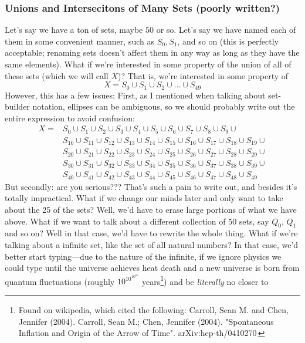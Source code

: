 \documentclass[10pt]{article}
\theoremstyle{definition}
\begin{document}
\subsubsection{Unions and Intersecitons of Many Sets (poorly written?)}
Let's say we have a ton of sets, maybe 50 or so.  Let's say we have
named each of them in some convenient manner, such as $S_0, S_1$, and
so on (this is perfectly acceptable; renaming sets doesn't affect them
in any way as long as they have the same elements).  What if we're
interested in some property of the union of all of these sets (which
we will call $X$)?  That is, we're interested in some property of
\[X = S_0\cup S_1\cup S_2 \cup \ldots \cup S_{49}\]
However, this has a few issues: First, as I mentioned when talking
about set-builder notation, ellipses can be ambiguous, so we should
probably write out the entire expression to avoid confusion:
\begin{align*}
X =&S_0\cup S_1\cup S_2 \cup S_3 \cup S_4 \cup S_5 \cup S_6 \cup S_7 \cup S_8 \cup S_9 \cup \\
&S_{10}\cup S_{11}\cup S_{12} \cup S_{13} \cup S_{14} \cup S_{15} \cup S_{16} \cup S_{17} \cup S_{18} \cup S_{19} \cup \\
&S_{20}\cup S_{21}\cup S_{22} \cup S_{23} \cup S_{24} \cup S_{25} \cup S_{26} \cup S_{27} \cup S_{28} \cup S_{29} \cup \\
&S_{30}\cup S_{31}\cup S_{32} \cup S_{33} \cup S_{34} \cup S_{35} \cup S_{36} \cup S_{37} \cup S_{38} \cup S_{39} \cup \\
&S_{40}\cup S_{41}\cup S_{42} \cup S_{43} \cup S_{44} \cup S_{45} \cup S_{46} \cup S_{47} \cup S_{48} \cup S_{49}
\end{align*}
But secondly: are you serious??? That's such a pain to write out, and
besides it's totally impractical.  What if we change our minds later
and only want to take about the 25 of the sets? Well, we'd have to
erase large portions of what we have above.  What if we want to talk
about a different collection of 50 sets, say $Q_0$, $Q_1$ and so on?
Well in that case, we'd have to rewrite the whole thing.  What if
we're talking about a infinite set, like the set of all natural
numbers?  In that case, we'd better start typing---due to the nature
of the infinite, if we ignore physics we could type until the universe
achieves heat death and a new universe is born from quantum
fluctuations (roughly $\displaystyle 10^{10^{10^{56}}}$
years\footnote{Found on wikipedia, which cited the following: Carroll,
  Sean M. and Chen, Jennifer (2004). Carroll, Sean M.; Chen, Jennifer
  (2004). "Spontaneous Inflation and Origin of the Arrow of Time".
  arXiv:hep-th/0410270 }) and be \emph{literally} no closer to
\end{document}
